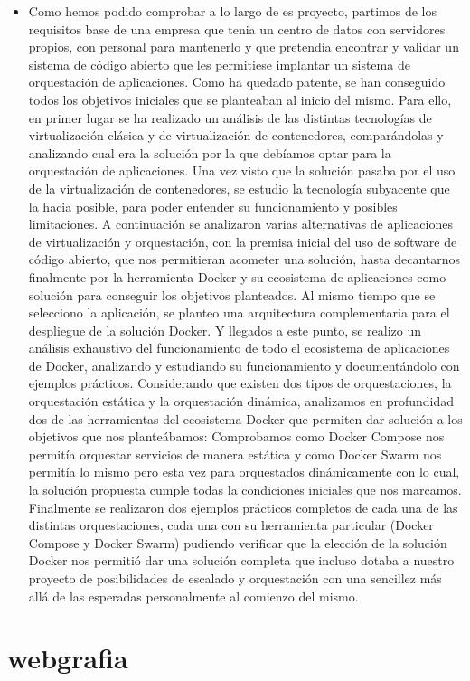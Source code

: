 \documentclass[%
 reprint,
 amsmath,amssymb,
 aps,
]{revtex4-1}
\begin{document}
\begin{itemize}
	\item Como hemos podido comprobar a lo largo de es proyecto, partimos de los requisitos base de una
empresa que tenia un centro de datos con servidores propios, con personal para mantenerlo y que
pretendía encontrar y validar un sistema de código abierto que les permitiese implantar un sistema
de orquestación de aplicaciones.
Como ha quedado patente, se han conseguido todos los objetivos iniciales que se planteaban al
inicio del mismo.
Para ello, en primer lugar se ha realizado un análisis de las distintas tecnologías de virtualización
clásica y de virtualización de contenedores, comparándolas y analizando cual era la solución por
la que debíamos optar para la orquestación de aplicaciones. Una vez visto que la solución pasaba
por el uso de la virtualización de contenedores, se estudio la tecnología subyacente que la hacia
posible, para poder entender su funcionamiento y posibles limitaciones. A continuación se
analizaron varias alternativas de aplicaciones de virtualización y orquestación, con la premisa
inicial del uso de software de código abierto, que nos permitieran acometer una solución, hasta
decantarnos finalmente por la herramienta Docker y su ecosistema de aplicaciones como solución
para conseguir los objetivos planteados.
Al mismo tiempo que se selecciono la aplicación, se planteo una arquitectura complementaria para
el despliegue de la solución Docker.
Y llegados a este punto, se realizo un análisis exhaustivo del funcionamiento de todo el
ecosistema de aplicaciones de Docker, analizando y estudiando su funcionamiento y
documentándolo con ejemplos prácticos.
Considerando que existen dos tipos de orquestaciones, la orquestación estática y la orquestación
dinámica, analizamos en profundidad dos de las herramientas del ecosistema Docker que
permiten dar solución a los objetivos que nos planteábamos: Comprobamos como Docker
Compose nos permitía orquestar servicios de manera estática y como Docker Swarm nos permitía
lo mismo pero esta vez para orquestados dinámicamente con lo cual, la solución propuesta
cumple todas la condiciones iniciales que nos marcamos.
Finalmente se realizaron dos ejemplos prácticos completos de cada una de las distintas
orquestaciones, cada una con su herramienta particular (Docker Compose y Docker Swarm)
pudiendo verificar que la elección de la solución Docker nos permitió dar una solución completa
que incluso dotaba a nuestro proyecto de posibilidades de escalado y orquestación con una
sencillez más allá de las esperadas personalmente al comienzo del mismo.

\end{itemize}

\section{webgrafia}\label{sec:9}



\end{document}
